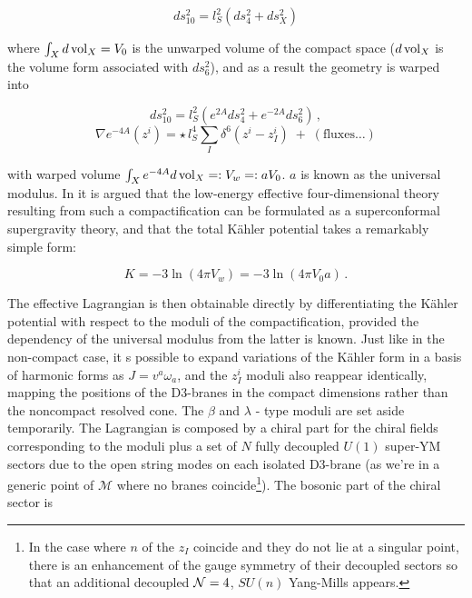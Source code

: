 \begin{equation}
	ds_{10}^2 = l_S^2 (ds^2_4 + ds^2_X)
	\label{}
\end{equation}

where $\int_X d\operatorname{vol}_X = V_0$ is the unwarped volume of the compact space ($d\operatorname{vol}_X$ is the volume form associated with $ds_6^2$), and as a result the geometry is warped into

\begin{equation}
	ds_{10}^2 = l_S^2 ( e^{2A} ds^2_4 + e^{-2A} ds^2_6 )\,,
\end{equation}
\begin{equation}
	\nabla e^{-4A}(z^i) = \star \, l_S^4 \sum_I \delta^6(z^i - z_I^i) \; + \; (\text {fluxes}\ldots)
	\label{}
\end{equation}

with warped volume $\int_X e^{-4A} d\operatorname{vol}_X =: V_w =: a V_0$. $a$ is known as the universal modulus. In \cite{MZ_2} it is argued that the low-energy effective four-dimensional theory resulting from such a compactification can be formulated as a superconformal supergravity theory, and that the total K\"ahler potential takes a remarkably simple form:

\begin{equation}
	K = -3 \ln(4\pi V_w) = -3 \ln(4 \pi V_0 a)\,.
	\label{warpedkahler}
\end{equation}

The effective Lagrangian is then obtainable directly by differentiating the K\"ahler potential with respect to the moduli of the compactification, provided the dependency of the universal modulus from the latter is known. Just like in the non-compact case, it s possible to expand variations of the K\"ahler form in a basis of harmonic forms as $J = v^a \omega_a$, and the $z_I^i$ moduli also reappear identically, mapping the positions of the D3-branes in the compact dimensions rather than the noncompact resolved cone. The $\beta$ and $\lambda$ - type moduli are set aside temporarily. The Lagrangian is composed by a chiral part for the chiral fields corresponding to the moduli plus a set of $N$ fully decoupled $U(1)$ super-YM sectors due to the open string modes on each isolated D3-brane (as we're in a generic point of $\mathcal{M}$ where no branes coincide\footnote{In the case where $n$ of the $z_I$ coincide and they do not lie at a singular point, there is an enhancement of the gauge symmetry of their decoupled sectors so that an additional decoupled $\mathcal{N}= 4$, $SU(n)$ Yang-Mills appears.}). The bosonic part of the chiral sector is


